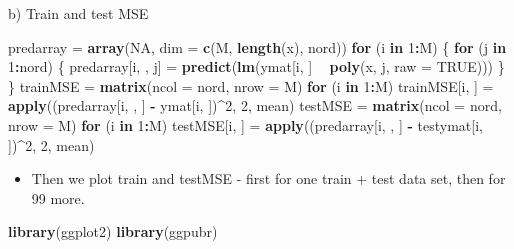 \documentclass[ignorenonframetext,]{beamer}
\newenvironment{Shaded}{\begin{snugshade}}{\end{snugshade}}
\newcommand{\KeywordTok}[1]{\textcolor[rgb]{0.13,0.29,0.53}{\textbf{#1}}}
\newcommand{\DataTypeTok}[1]{\textcolor[rgb]{0.13,0.29,0.53}{#1}}
\newcommand{\DecValTok}[1]{\textcolor[rgb]{0.00,0.00,0.81}{#1}}
\newcommand{\StringTok}[1]{\textcolor[rgb]{0.31,0.60,0.02}{#1}}
\newcommand{\OtherTok}[1]{\textcolor[rgb]{0.56,0.35,0.01}{#1}}
\newcommand{\ControlFlowTok}[1]{\textcolor[rgb]{0.13,0.29,0.53}{\textbf{#1}}}
\newcommand{\OperatorTok}[1]{\textcolor[rgb]{0.81,0.36,0.00}{\textbf{#1}}}
\newcommand{\NormalTok}[1]{#1}
\providecommand{\tightlist}{%
  \setlength{\itemsep}{0pt}\setlength{\parskip}{0pt}}
\begin{document}
\begin{frame}[fragile]
\begin{block}{b) Train and test MSE}
\begin{Shaded}
\begin{Highlighting}[]
\NormalTok{predarray =}\StringTok{ }\KeywordTok{array}\NormalTok{(}\OtherTok{NA}\NormalTok{, }\DataTypeTok{dim =} \KeywordTok{c}\NormalTok{(M, }\KeywordTok{length}\NormalTok{(x), nord))}
\ControlFlowTok{for}\NormalTok{ (i }\ControlFlowTok{in} \DecValTok{1}\OperatorTok{:}\NormalTok{M) \{}
    \ControlFlowTok{for}\NormalTok{ (j }\ControlFlowTok{in} \DecValTok{1}\OperatorTok{:}\NormalTok{nord) \{}
\NormalTok{        predarray[i, , j] =}\StringTok{ }\KeywordTok{predict}\NormalTok{(}\KeywordTok{lm}\NormalTok{(ymat[i, ] }\OperatorTok{~}\StringTok{ }\KeywordTok{poly}\NormalTok{(x, j, }\DataTypeTok{raw =} \OtherTok{TRUE}\NormalTok{)))}
\NormalTok{    \}}
\NormalTok{\}}
\NormalTok{trainMSE =}\StringTok{ }\KeywordTok{matrix}\NormalTok{(}\DataTypeTok{ncol =}\NormalTok{ nord, }\DataTypeTok{nrow =}\NormalTok{ M)}
\ControlFlowTok{for}\NormalTok{ (i }\ControlFlowTok{in} \DecValTok{1}\OperatorTok{:}\NormalTok{M) trainMSE[i, ] =}\StringTok{ }\KeywordTok{apply}\NormalTok{((predarray[i, , ] }\OperatorTok{-}\StringTok{ }\NormalTok{ymat[i, ])}\OperatorTok{^}\DecValTok{2}\NormalTok{, }
    \DecValTok{2}\NormalTok{, mean)}
\NormalTok{testMSE =}\StringTok{ }\KeywordTok{matrix}\NormalTok{(}\DataTypeTok{ncol =}\NormalTok{ nord, }\DataTypeTok{nrow =}\NormalTok{ M)}
\ControlFlowTok{for}\NormalTok{ (i }\ControlFlowTok{in} \DecValTok{1}\OperatorTok{:}\NormalTok{M) testMSE[i, ] =}\StringTok{ }\KeywordTok{apply}\NormalTok{((predarray[i, , ] }\OperatorTok{-}\StringTok{ }\NormalTok{testymat[i, ])}\OperatorTok{^}\DecValTok{2}\NormalTok{, }
    \DecValTok{2}\NormalTok{, mean)}
\end{Highlighting}
\end{Shaded}

\begin{itemize}
\tightlist
\item
  Then we plot train and testMSE - first for one train + test data set,
  then for 99 more.
\end{itemize}

\begin{Shaded}
\begin{Highlighting}[]
\KeywordTok{library}\NormalTok{(ggplot2)}
\KeywordTok{library}\NormalTok{(ggpubr)}


\end{Highlighting}
\end{Shaded}
\end{block}
\end{frame}
\end{document}

